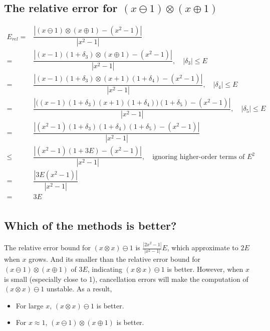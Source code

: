 \documentclass{article}
\begin{document}
\subsection*{The relative error for $(x \ominus 1) \otimes (x \oplus 1)$}
$$
    \begin{aligned}
        E_{rel}= & \dfrac{|(x \ominus 1) \otimes (x \oplus 1) - (x^2 - 1)|}{|x^2 - 1|}                                                          \\
        =        & \dfrac{|(x - 1)(1 + \delta_3) \otimes (x \oplus 1) - (x^2 - 1)|}{|x^2 - 1|}, \quad |\delta_3| \leq E                         \\
        =        & \dfrac{|(x - 1)(1 + \delta_3) \otimes (x + 1)(1 + \delta_4) - (x^2 - 1)|}{|x^2 - 1|}, \quad |\delta_4| \leq E                \\
        =        & \dfrac{|\big((x - 1)(1 + \delta_3)(x + 1)(1 + \delta_4)\big)(1 + \delta_5) - (x^2 - 1)|}{|x^2 - 1|}, \quad |\delta_5| \leq E \\
        =        & \dfrac{|(x^2 - 1)(1 + \delta_3)(1 + \delta_4)(1 + \delta_5) - (x^2 - 1)|}{|x^2 - 1|}                                         \\
        \leq     & \dfrac{|(x^2 - 1)(1 + 3E) - (x^2 - 1)|}{|x^2 - 1|}, \quad \text{ignoring higher-order terms of $E^2$}                        \\
        =        & \dfrac{|3E(x^2 - 1)|}{|x^2 - 1|}                                                                                             \\
        =        & \boxed{3E}                                                                                                                   \\
    \end{aligned}
$$

\subsection*{Which of the methods is better?}
The relative error bound for $(x \otimes x) \ominus 1$ is $\frac{|2x^2 - 1|}{|x^2 - 1|}E$, which approximate to $2E$ when $x$ grows. And its smaller than the relative error bound for $(x \ominus 1) \otimes (x \oplus 1)$ of $3E$, indicating $(x \otimes x) \ominus 1$ is better. However, when $x$ is small (especially close to 1), cancellation errors will make the computation of $(x \otimes x) \ominus 1$ unstable. As a result,
\begin{itemize}
    \item For large $x$, $(x \otimes x) \ominus 1$ is better.
    \item For $x\approx 1$, $(x \ominus 1) \otimes (x \oplus 1)$ is better.
\end{itemize}
\end{document}

